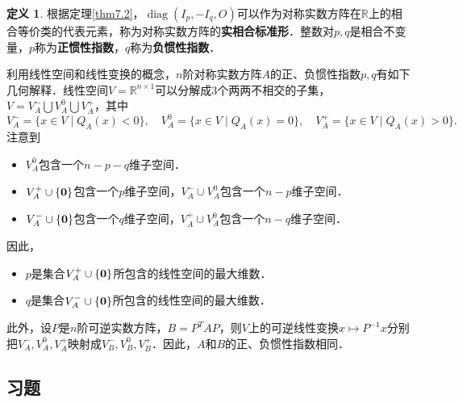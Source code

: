 \documentclass[a4paper,fontset=windows]{ctexbook}
\theoremstyle{definition}
\newtheorem{definition}{定义}[chapter]
\DeclareMathOperator{\diag}{diag}
\begin{document}
\begin{definition}
根据定理\ref{thm7.2}，$\diag(I_p,-I_q,O)$可以作为对称实数方阵在$\mathbb{R}$上的相合等价类的代表元素，称为对称实数方阵的{\bf 实相合标准形}．整数对$p,q$是相合不变量，$p$称为{\bf 正惯性指数}，$q$称为{\bf 负惯性指数}．
\end{definition}

利用线性空间和线性变换的概念，$n$阶对称实数方阵$A$的正、负惯性指数$p,q$有如下几何解释．线性空间$V=\mathbb{R}^{n\times 1}$可以分解成3个两两不相交的子集，$V=V_A^-\bigcup V_A^0\bigcup V_A^+$，其中
$$V_A^-=\{x\in V\mid Q_A(x)<0\},\quad V_A^0=\{x\in V\mid Q_A(x)=0\},\quad V_A^+=\{x\in V\mid Q_A(x)>0\}.$$
注意到
\begin{itemize}
\item $V_A^0$包含一个$n-p-q$维子空间．
\item $V_A^+\cup\{{\bf 0}\}$包含一个$p$维子空间，$V_A^-\cup V_A^0$包含一个$n-p$维子空间．
\item $V_A^-\cup\{{\bf 0}\}$包含一个$q$维子空间，$V_A^+\cup V_A^0$包含一个$n-q$维子空间．
\end{itemize}
因此，
\begin{itemize}
\item $p$是集合$V_A^+\cup\{{\bf 0}\}$所包含的线性空间的最大维数．
\item $q$是集合$V_A^-\cup\{{\bf 0}\}$所包含的线性空间的最大维数．
\end{itemize}
此外，设$P$是$n$阶可逆实数方阵，$B=P^TAP$，则$V$上的可逆线性变换$x\mapsto P^{-1}x$分别把$V_A^-,V_A^0,V_A^+$映射成$V_B^-,V_B^0,V_B^+$．因此，$A$和$B$的正、负惯性指数相同．

\subsection*{习题}
\end{document}
